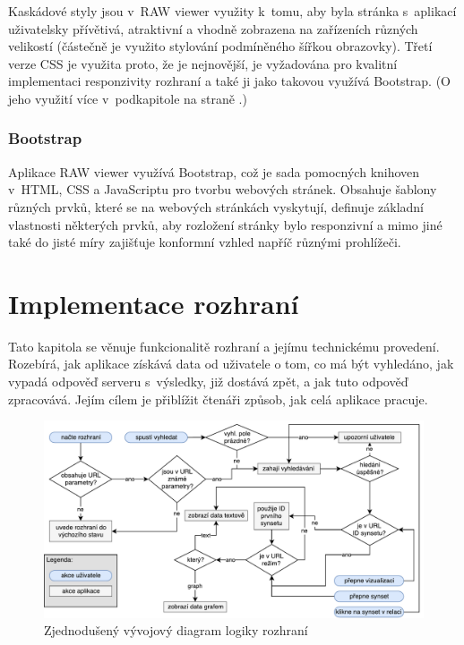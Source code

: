 \documentclass[a4paper,11pt,openany,twoside]{book}
\newcommand{\simplywn}{RAW viewer }
\newcommand{\itNameRef}[1]{\textit{\nameref{#1}}}
\begin{document}
				Kaskádové styly jsou v~\simplywn využity k~tomu, aby byla stránka s~aplikací uživatelsky přívětivá, atraktivní a vhodně zobrazena na zařízeních různých velikostí (částečně je využito stylování podmíněného šířkou obrazovky). Třetí verze CSS je využita proto, že je nejnovější, je vyžadována pro kvalitní implementaci responzivity rozhraní a také ji jako takovou využívá Bootstrap. (O jeho využití více v~podkapitole \itNameRef{cha:bootstrap} na straně \pageref{cha:bootstrap}.) 

				\subsection{Bootstrap}
				\label{cha:bootstrap}

					Aplikace \simplywn využívá Bootstrap, což je sada pomocných knihoven v~HTML, CSS a JavaScriptu pro tvorbu webových stránek. Obsahuje šablony různých prvků, které se na webových stránkách vyskytují, definuje základní vlastnosti některých prvků, aby rozložení stránky bylo responzivní a mimo jiné také do jisté míry zajišťuje konformní vzhled napříč různými prohlížeči. \parencite{bootstrapWeb}

		\chapter{Implementace rozhraní}

			Tato kapitola se věnuje funkcionalitě rozhraní a jejímu technickému provedení. Rozebírá, jak aplikace získává data od uživatele o tom, co má být vyhledáno, jak vypadá odpověď serveru s~výsledky, již dostává zpět, a jak tuto odpověď zpracovává. Jejím cílem je přiblížit čtenáři způsob, jak celá aplikace pracuje.



			\begin{figure}[h]
				\centering
				\includegraphics[width=1.0\textwidth]{wordnet-ui-diag_v3.pdf}
				\caption{Zjednodušený vývojový diagram logiky rozhraní}
				\label{fig:wordnet-ui-diag}
			\end{figure}
\end{document}
